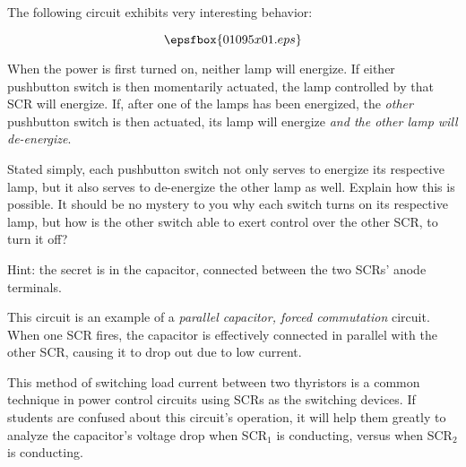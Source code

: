 

The following circuit exhibits very interesting behavior:

$$\epsfbox{01095x01.eps}$$

When the power is first turned on, neither lamp will energize.  If either pushbutton switch is then momentarily actuated, the lamp controlled by that SCR will energize.  If, after one of the lamps has been energized, the {\it other} pushbutton switch is then actuated, its lamp will energize {\it and the other lamp will de-energize}.

Stated simply, each pushbutton switch not only serves to energize its respective lamp, but it also serves to de-energize the other lamp as well.  Explain how this is possible.  It should be no mystery to you why each switch turns on its respective lamp, but how is the other switch able to exert control over the other SCR, to turn it off?

\vskip 10pt

Hint: the secret is in the capacitor, connected between the two SCRs' anode terminals.







This circuit is an example of a {\it parallel capacitor, forced commutation} circuit.  When one SCR fires, the capacitor is effectively connected in parallel with the other SCR, causing it to drop out due to low current.







This method of switching load current between two thyristors is a common technique in power control circuits using SCRs as the switching devices.  If students are confused about this circuit's operation, it will help them greatly to analyze the capacitor's voltage drop when SCR$_{1}$ is conducting, versus when SCR$_{2}$ is conducting.





